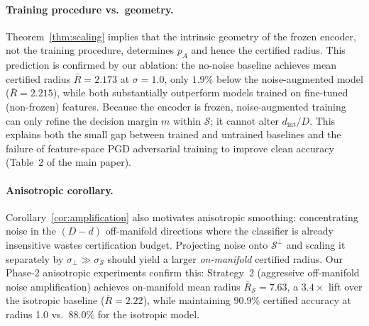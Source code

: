 \paragraph*{Training procedure vs.\ geometry.}
Theorem~\ref{thm:scaling} implies that the intrinsic geometry of
the frozen encoder, not the training procedure, determines
$p_A$ and hence the certified radius.
This prediction is confirmed by our ablation: the no-noise baseline
achieves mean certified radius $\bar{R}=2.173$ at $\sigma=1.0$,
only $1.9\%$ below the noise-augmented model ($\bar{R}=2.215$),
while both substantially outperform models trained on fine-tuned
(non-frozen) features.
Because the encoder is frozen, noise-augmented training can only
refine the decision margin $m$ within $\mathcal{S}$; it cannot
alter $d_\text{int}/D$.
This explains both the small gap between trained and untrained
baselines and the failure of feature-space PGD adversarial training
to improve clean accuracy (Table~2 of the main paper).

\paragraph*{Anisotropic corollary.}
Corollary~\ref{cor:amplification} also motivates anisotropic smoothing:
concentrating noise in the $(D-d)$ off-manifold directions where the
classifier is already insensitive wastes certification budget.
Projecting noise onto $\mathcal{S}^{\perp}$ and scaling it
separately by $\sigma_\perp \gg \sigma_\mathcal{S}$ should yield
a larger \emph{on-manifold} certified radius.
Our Phase-2 anisotropic experiments confirm this:
Strategy~2 (aggressive off-manifold noise amplification) achieves
on-manifold mean radius $\bar{R}_\mathcal{S}=7.63$, a
$3.4\times$ lift over the isotropic baseline ($\bar{R}=2.22$),
while maintaining $90.9\%$ certified accuracy at radius 1.0
vs.\ $88.0\%$ for the isotropic model.


